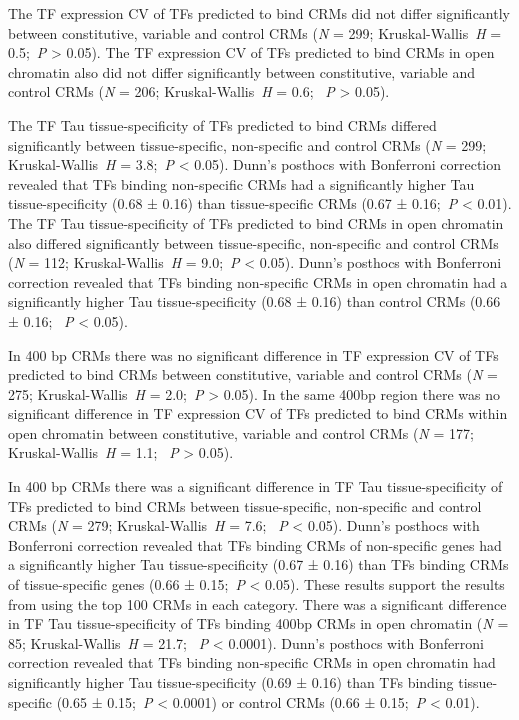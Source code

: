 \documentclass[../main.tex]{subfiles}
\begin{document}
{{The TF expression CV of TFs predicted to bind CRMs did not differ significantly between constitutive, variable and control CRMs (\textit{N} = 299; Kruskal\hyp{}Wallis~\textit{H} = 0.5;~\textit{P} \textgreater{} 0.05).
The TF expression CV of TFs predicted to bind CRMs in open chromatin also did not differ significantly between constitutive, variable and control CRMs (\textit{N} = 206; Kruskal\hyp{}Wallis~\textit{H} = 0.6; ~\textit{P} \textgreater{} 0.05).

The TF Tau tissue\hyp{}specificity of TFs predicted to bind CRMs differed significantly between tissue\hyp{}specific, non\hyp{}specific and control CRMs (\textit{N} = 299; Kruskal\hyp{}Wallis~\textit{H} = 3.8;~\textit{P} \textless{} 0.05).
Dunn's posthocs with Bonferroni correction revealed that TFs binding non\hyp{}specific CRMs had a significantly higher Tau tissue\hyp{}specificity (0.68 ± 0.16) than tissue\hyp{}specific CRMs (0.67 ± 0.16;~\textit{P} \textless{} 0.01).
The TF Tau tissue\hyp{}specificity of TFs predicted to bind CRMs in open chromatin also differed significantly between tissue\hyp{}specific, non\hyp{}specific and control CRMs (\textit{N} = 112; Kruskal\hyp{}Wallis~\textit{H} = 9.0;~\textit{P} \textless{} 0.05).
Dunn's posthocs with Bonferroni correction revealed that TFs binding non\hyp{}specific CRMs in open chromatin had a significantly higher Tau tissue\hyp{}specificity (0.68 ± 0.16) than control CRMs (0.66 ± 0.16; ~\textit{P} \textless{} 0.05).

In 400 bp CRMs there was no significant difference in TF expression CV of TFs predicted to bind CRMs between constitutive, variable and control CRMs (\textit{N} = 275; Kruskal\hyp{}Wallis~\textit{H} = 2.0;~\textit{P} \textgreater{} 0.05).
In the same 400bp region there was no significant difference in TF expression CV of TFs predicted to bind CRMs within open chromatin between constitutive, variable and control CRMs (\textit{N} = 177; Kruskal\hyp{}Wallis~\textit{H} = 1.1; ~\textit{P} \textgreater{} 0.05).



In 400 bp CRMs there was a significant difference in TF Tau tissue\hyp{}specificity of TFs predicted to bind CRMs between tissue\hyp{}specific, non\hyp{}specific and control CRMs (\textit{N} = 279; Kruskal\hyp{}Wallis~\textit{H} = 7.6; ~\textit{P} \textless{} 0.05).
Dunn's posthocs with Bonferroni correction revealed that TFs binding CRMs of non\hyp{}specific genes had a significantly higher Tau tissue\hyp{}specificity (0.67 ± 0.16) than TFs binding CRMs of tissue\hyp{}specific genes (0.66 ± 0.15;~\textit{P} \textless{} 0.05).
These results support the results from using the top 100 CRMs in each category.
There was a significant difference in TF Tau tissue\hyp{}specificity of TFs binding 400bp CRMs in open chromatin (\textit{N} = 85; Kruskal\hyp{}Wallis~\textit{H} = 21.7; ~\textit{P} \textless{} 0.0001).
Dunn's posthocs with Bonferroni correction revealed that TFs binding non\hyp{}specific CRMs in open chromatin had significantly higher Tau tissue\hyp{}specificity (0.69 ± 0.16) than TFs binding tissue\hyp{}specific (0.65 ± 0.15;~\textit{P} \textless{} 0.0001) or control CRMs (0.66 ± 0.15;~\textit{P} \textless{} 0.01).





}}
\end{document}
